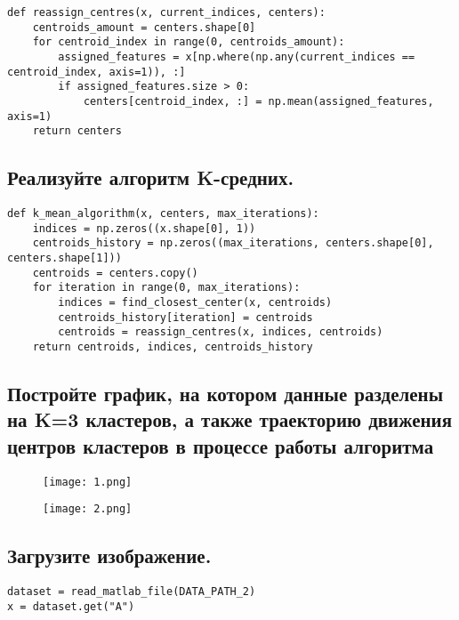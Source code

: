 \begin{lstlisting}
def reassign_centres(x, current_indices, centers):
    centroids_amount = centers.shape[0]
    for centroid_index in range(0, centroids_amount):
        assigned_features = x[np.where(np.any(current_indices == centroid_index, axis=1)), :]
        if assigned_features.size > 0:
            centers[centroid_index, :] = np.mean(assigned_features, axis=1)
    return centers
\end{lstlisting}

\subsection{Реализуйте алгоритм K-средних.}

\begin{lstlisting}
def k_mean_algorithm(x, centers, max_iterations):
    indices = np.zeros((x.shape[0], 1))
    centroids_history = np.zeros((max_iterations, centers.shape[0], centers.shape[1]))
    centroids = centers.copy()
    for iteration in range(0, max_iterations):
        indices = find_closest_center(x, centroids)
        centroids_history[iteration] = centroids
        centroids = reassign_centres(x, indices, centroids)
    return centroids, indices, centroids_history
\end{lstlisting}

\subsection{Постройте график, на котором данные разделены на K=3 кластеров, а также траекторию движения центров кластеров в процессе работы алгоритма}

\begin{figure}[h]
\centering
    \texttt{[image: 1.png]}
  \label{sec:purpose:payings}
\end{figure}

\begin{figure}[h]
\centering
    \texttt{[image: 2.png]}
  \label{sec:purpose:payings}
\end{figure}

\subsection{Загрузите изображение.}

\begin{lstlisting}
dataset = read_matlab_file(DATA_PATH_2)
x = dataset.get("A")
\end{lstlisting}

